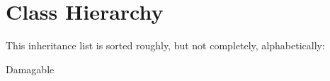 \section{Class Hierarchy}
This inheritance list is sorted roughly, but not completely, alphabetically\+:\begin{DoxyCompactList}
\item Damagable\begin{DoxyCompactList}
\item {}
\begin{DoxyCompactList}
\item {}
\end{DoxyCompactList}
\end{DoxyCompactList}
\item {}
\item {}
\begin{DoxyCompactList}
\item {}
\begin{DoxyCompactList}
\item {}
\end{DoxyCompactList}
\end{DoxyCompactList}
\item {}
\end{DoxyCompactList}
